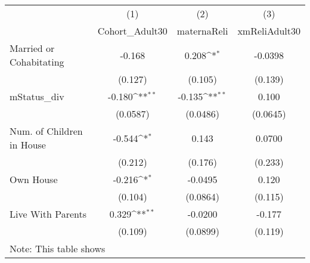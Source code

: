 {
\def\sym#1{\ifmmode^{#1}\else\(^{#1}\)\fi}
\begin{tabular}{l*{3}{c}}
\hline\hline
            &\multicolumn{1}{c}{(1)}&\multicolumn{1}{c}{(2)}&\multicolumn{1}{c}{(3)}\\
            &\multicolumn{1}{c}{Cohort\_Adult30}&\multicolumn{1}{c}{maternaReli}&\multicolumn{1}{c}{xmReliAdult30}\\
\hline
Married or Cohabitating&      -0.168         &       0.208\sym{*}  &     -0.0398         \\
            &     (0.127)         &     (0.105)         &     (0.139)         \\
[1em]
mStatus\_div &      -0.180\sym{**} &      -0.135\sym{**} &       0.100         \\
            &    (0.0587)         &    (0.0486)         &    (0.0645)         \\
[1em]
Num. of Children in House&      -0.544\sym{*}  &       0.143         &      0.0700         \\
            &     (0.212)         &     (0.176)         &     (0.233)         \\
[1em]
Own House   &      -0.216\sym{*}  &     -0.0495         &       0.120         \\
            &     (0.104)         &    (0.0864)         &     (0.115)         \\
[1em]
Live With Parents&       0.329\sym{**} &     -0.0200         &      -0.177         \\
            &     (0.109)         &    (0.0899)         &     (0.119)         \\
\hline\hline
\multicolumn{4}{l}{\footnotesize Note: This table shows}\\
\end{tabular}
}
